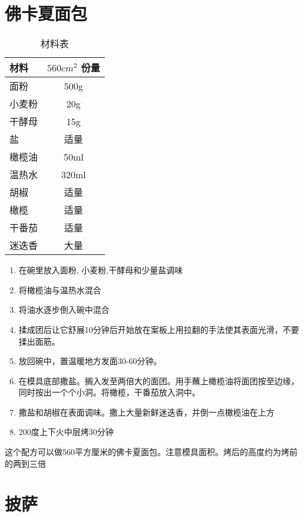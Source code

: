 \section{佛卡夏面包}

\begin{table}[H]
    \centering
    \begin{tabular}{|l||c|}\hline
     \textbf{材料}    & $560cm^2$ \textbf{份量}\\ \hline\hline
    面粉 & 500g \\ \hline
    小麦粉 & 20g \\ \hline
    干酵母 & 15g \\ \hline
    盐 & 适量 \\ \hline
    橄榄油 & 50ml \\ \hline
    温热水 & 320ml \\ \hline
    胡椒 & 适量 \\ \hline
    橄榄 & 适量 \\ \hline
    干番茄 & 适量 \\ \hline
    迷迭香 & 大量 \\ \hline
    \end{tabular}
    \caption{材料表}
\end{table}
\begin{enumerate}
    \item 在碗里放入面粉, 小麦粉,干酵母和少量盐调味
    \item 将橄榄油与温热水混合
    \item 将油水逐步倒入碗中混合
    \item 揉成团后让它舒展10分钟后开始放在案板上用拉翻的手法使其表面光滑，不要揉出面筋。
    \item 放回碗中，置温暖地方发面30-60分钟。
    \item 在模具底部撒盐。搁入发至两倍大的面团。用手蘸上橄榄油将面团按至边缘，同时按出一个个小洞。将橄榄，干番茄放入洞中。
    \item 撒盐和胡椒在表面调味。撒上大量新鲜迷迭香，并倒一点橄榄油在上方
    \item 200度上下火中层烤30分钟
\end{enumerate}

这个配方可以做560平方厘米的佛卡夏面包。注意模具面积。烤后的高度约为烤前的两到三倍

\section{披萨}

